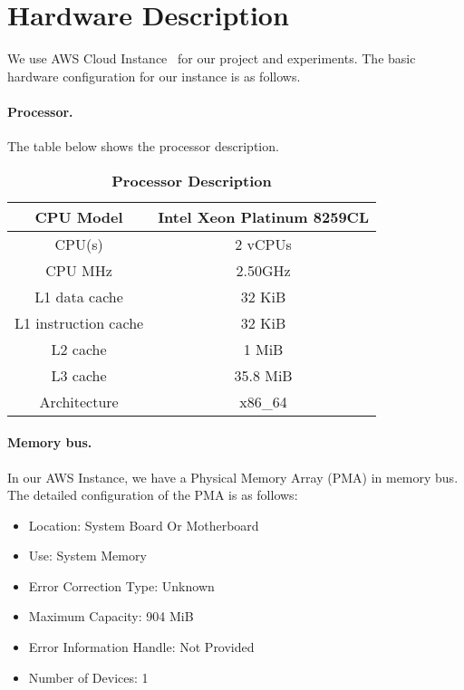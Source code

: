 \section{Hardware Description}
\label{sec:hardware}
We use AWS Cloud Instance~\cite{awsi4} for our project and experiments. The basic hardware configuration for our instance is as follows.

\paragraph{Processor.} The table below shows the processor description.
\begin{table}[h]
	\centering
	\begin{tabular}{c|c}
		\hline
		CPU Model & Intel Xeon Platinum 8259CL  \\ \hline
		
		CPU(s) & 2 vCPUs \\ \hline

		CPU MHz & 2.50GHz \\ \hline
		
		L1 data cache & 32 KiB \\ \hline
		L1 instruction cache & 32 KiB \\ \hline
		L2 cache & 1 MiB \\ \hline
		L3 cache & 35.8 MiB \\ \hline
		Architecture & x86\_64 \\ \hline
	\end{tabular}
	\caption{\textbf{Processor Description}}
	\label{table:sys-conf}
\end{table}

\paragraph{Memory bus.} In our AWS Instance, we have a Physical Memory Array (PMA) in memory bus. The detailed configuration of the PMA is as follows:
\begin{itemize}[leftmargin=*]
	\item Location: System Board Or Motherboard
	\item Use: System Memory
	\item Error Correction Type: Unknown
	\item Maximum Capacity: 904 MiB
	\item Error Information Handle: Not Provided
	\item Number of Devices: 1
\end{itemize}

